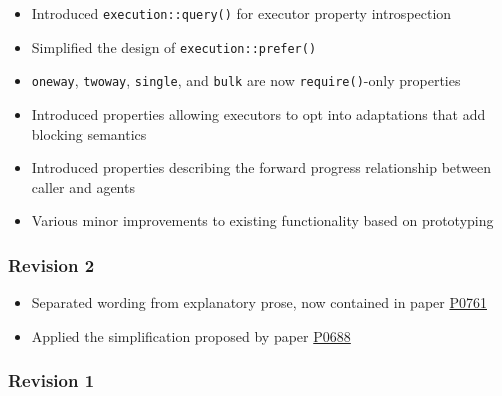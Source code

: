 \documentclass[a4paper,12pt,notitlepage,twoside,openright]{article}
\begin{document}
\begin{itemize}

\item
  Introduced \texttt{execution::query()} for executor
  property introspection
\item
  Simplified the design of \texttt{execution::prefer()}
\item
  \texttt{oneway}, \texttt{twoway},
  \texttt{single}, and \texttt{bulk} are now
  \texttt{require()}-only properties
\item
  Introduced properties allowing executors to opt into adaptations that
  add blocking semantics
\item
  Introduced properties describing the forward progress relationship
  between caller and agents
\item
  Various minor improvements to existing functionality based on
  prototyping
\end{itemize}

\hypertarget{revision-2}{%
\subsubsection{Revision 2}\label{revision-2}}

\begin{itemize}

\item
  Separated wording from explanatory prose, now contained in paper
  \href{https://wg21.link/P0761}{P0761}
\item
  Applied the simplification proposed by paper
  \href{https://wg21.link/P0688}{P0688}
\end{itemize}

\hypertarget{revision-1}{%
\subsubsection{Revision 1}\label{revision-1}}
\end{document}

